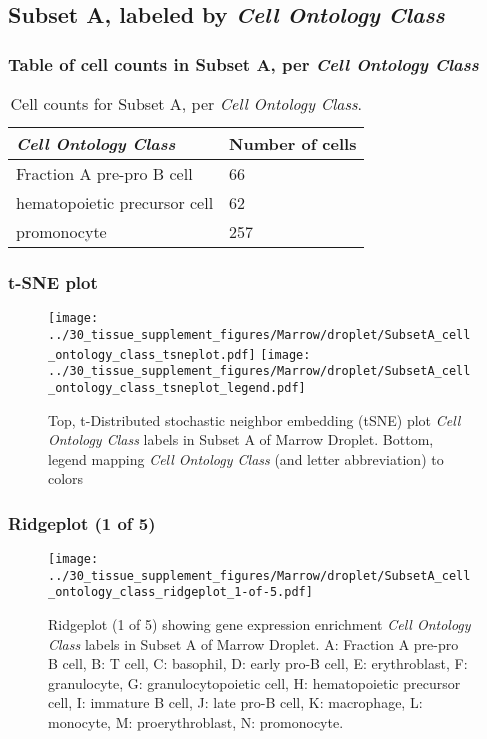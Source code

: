 \clearpage

\subsection{Subset A, labeled by \emph{Cell Ontology Class}}
\subsubsection{Table of cell counts in Subset A, per \emph{Cell Ontology Class}}\begin{table}[h]
\centering
\label{my-label}
\begin{tabular}{@{}ll@{}}
\toprule

\emph{Cell Ontology Class}& Number of cells \\ \midrule
Fraction A pre-pro B cell & 66 \\

hematopoietic precursor cell & 62 \\

promonocyte & 257 \\
\bottomrule
\end{tabular}
\caption{Cell counts for Subset A, per \emph{Cell Ontology Class}.}
\end{table}

\clearpage
\subsubsection{t-SNE plot}
\begin{figure}[h]
\centering
\texttt{[image: ../30\_tissue\_supplement\_figures/Marrow/droplet/SubsetA\_cell\_ontology\_class\_tsneplot.pdf]}
\texttt{[image: ../30\_tissue\_supplement\_figures/Marrow/droplet/SubsetA\_cell\_ontology\_class\_tsneplot\_legend.pdf]}
\caption{Top, t-Distributed stochastic neighbor embedding (tSNE) plot  \emph{Cell Ontology Class} labels in Subset A of Marrow Droplet. Bottom, legend mapping \emph{Cell Ontology Class} (and letter abbreviation) to colors}
\end{figure}


\clearpage

\subsubsection{Ridgeplot (1 of 5)}
\begin{figure}[h]
\centering
\texttt{[image: ../30\_tissue\_supplement\_figures/Marrow/droplet/SubsetA\_cell\_ontology\_class\_ridgeplot\_1-of-5.pdf]}

\caption{ Ridgeplot (1 of 5)  showing gene expression enrichment \emph{Cell Ontology Class} labels in Subset A of Marrow Droplet. A: Fraction A pre-pro B cell, B: T cell, C: basophil, D: early pro-B cell, E: erythroblast, F: granulocyte, G: granulocytopoietic cell, H: hematopoietic precursor cell, I: immature B cell, J: late pro-B cell, K: macrophage, L: monocyte, M: proerythroblast, N: promonocyte.}
\end{figure}


